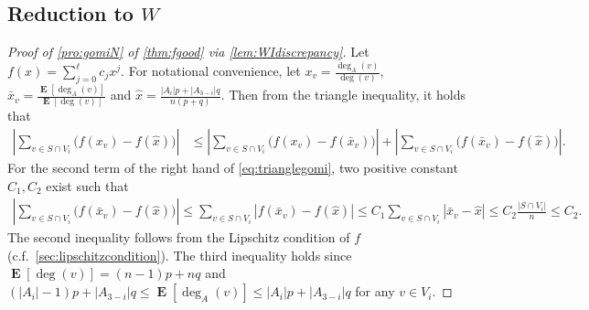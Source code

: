 \documentclass[letterpaper,11pt]{article}
\DeclareMathOperator{\E}{\mathbf{E}}
\begin{document}
\subsection[Reduction to W]{Reduction to $W$}\label{sec:reduction}
%
\begin{proof}[Proof of \ref{pro:gomiN} of \cref{thm:fgood} via \cref{lem:WIdiscrepancy}]
Let $f(x)=\sum_{j=0}^\ell c_jx^j$.
For notational convenience, 
let $x_v=\frac{\deg_A(v)}{\deg(v)}$, $\bar{x}_v=\frac{\E[\deg_A(v)]}{\E[\deg(v)]}$ and $\hat{x}=\frac{|A_{i}|p+|A_{3-i}|q}{n(p+q)}$.
Then from the triangle inequality, it holds that
\begin{align}
\left|\sum_{v\in S\cap V_i}\bigl(f(x_v)-f(\hat{x})\bigr)\right|
&\leq \left|\sum_{v\in S\cap V_i}\bigl(f(x_v)-f(\bar{x}_v)\bigr)\right|+\left|\sum_{v\in S\cap V_i}\bigl(f(\bar{x}_v)-f(\hat{x})\bigr)\right|.
\label{eq:trianglegomi}
\end{align}
For the second term of the right hand of \cref{eq:trianglegomi}, two positive constant $C_1, C_2$ exist such that
\begin{align*}
\left|\sum_{v\in S\cap V_i}\bigl(f(\bar{x}_v)-f(\hat{x})\bigr)\right|
\leq \sum_{v\in S\cap V_i}|f(\bar{x}_v)-f(\hat{x})|
\leq C_1\sum_{v\in S\cap V_i}|\bar{x}_v-\hat{x}|
\leq C_2\frac{|S\cap V_i|}{n} 
\leq C_2.
\end{align*}
The second inequality follows from the Lipschitz condition of $f$ (c.f.~\cref{sec:lipschitzcondition}).
The third inequality holds since $\E[\deg(v)]=(n-1)p+nq$ and $(|A_{i}|-1)p+|A_{3-i}|q \leq \E[\deg_A(v)]\leq |A_{i}|p+|A_{3-i}|q$ for any $v\in V_i$.


\end{proof}
\end{document}
